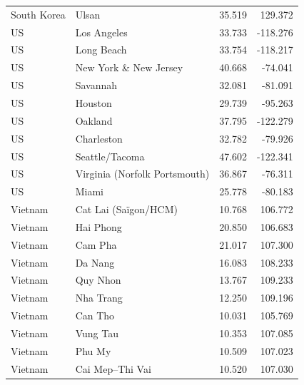 \documentclass[11pt]{article}
\begin{document}
\begin{table}[htbp]
{\begin{tabular}{llrr}
South Korea & Ulsan & 35.519 & 129.372 \\
US & Los Angeles & 33.733 & -118.276 \\
US & Long Beach & 33.754 & -118.217 \\
US & New York \& New Jersey & 40.668 & -74.041 \\
US & Savannah & 32.081 & -81.091 \\
US & Houston & 29.739 & -95.263 \\
US & Oakland & 37.795 & -122.279 \\
US & Charleston & 32.782 & -79.926 \\
US & Seattle/Tacoma & 47.602 & -122.341 \\
US & Virginia (Norfolk Portsmouth) & 36.867 & -76.311 \\
US & Miami & 25.778 & -80.183 \\
Vietnam & Cat Lai (Saïgon/HCM) & 10.768 & 106.772 \\
Vietnam & Hai Phong & 20.850 & 106.683 \\
Vietnam & Cam Pha & 21.017 & 107.300 \\
Vietnam & Da Nang & 16.083 & 108.233 \\
Vietnam & Quy Nhon & 13.767 & 109.233 \\
Vietnam & Nha Trang & 12.250 & 109.196 \\
Vietnam & Can Tho & 10.031 & 105.769 \\
Vietnam & Vung Tau & 10.353 & 107.085 \\
Vietnam & Phu My & 10.509 & 107.023 \\
Vietnam & Cai Mep–Thi Vai & 10.520 & 107.030 \\
\bottomrule
\end{tabular}
}
\end{table}
\end{document}
